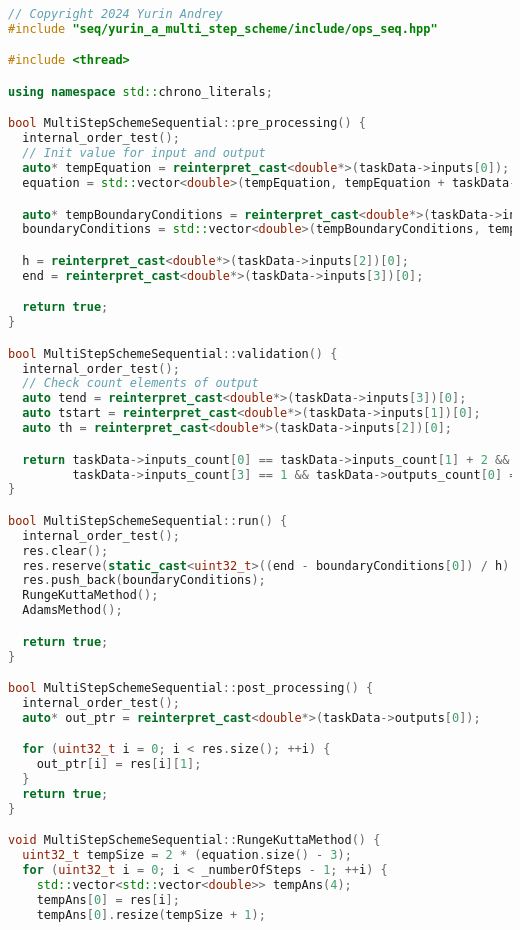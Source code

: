 \documentclass{report}
\begin{document}
\begin{lstlisting}[language=C++,caption=Последовательная версия]
// Copyright 2024 Yurin Andrey
#include "seq/yurin_a_multi_step_scheme/include/ops_seq.hpp"

#include <thread>

using namespace std::chrono_literals;

bool MultiStepSchemeSequential::pre_processing() {
  internal_order_test();
  // Init value for input and output
  auto* tempEquation = reinterpret_cast<double*>(taskData->inputs[0]);
  equation = std::vector<double>(tempEquation, tempEquation + taskData->inputs_count[0]);

  auto* tempBoundaryConditions = reinterpret_cast<double*>(taskData->inputs[1]);
  boundaryConditions = std::vector<double>(tempBoundaryConditions, tempBoundaryConditions + taskData->inputs_count[1]);

  h = reinterpret_cast<double*>(taskData->inputs[2])[0];
  end = reinterpret_cast<double*>(taskData->inputs[3])[0];

  return true;
}

bool MultiStepSchemeSequential::validation() {
  internal_order_test();
  // Check count elements of output
  auto tend = reinterpret_cast<double*>(taskData->inputs[3])[0];
  auto tstart = reinterpret_cast<double*>(taskData->inputs[1])[0];
  auto th = reinterpret_cast<double*>(taskData->inputs[2])[0];

  return taskData->inputs_count[0] == taskData->inputs_count[1] + 2 && taskData->inputs_count[2] == 1 &&
         taskData->inputs_count[3] == 1 && taskData->outputs_count[0] == (tend - tstart) / th + 1;
}

bool MultiStepSchemeSequential::run() {
  internal_order_test();
  res.clear();
  res.reserve(static_cast<uint32_t>((end - boundaryConditions[0]) / h) + 2);
  res.push_back(boundaryConditions);
  RungeKuttaMethod();
  AdamsMethod();

  return true;
}

bool MultiStepSchemeSequential::post_processing() {
  internal_order_test();
  auto* out_ptr = reinterpret_cast<double*>(taskData->outputs[0]);

  for (uint32_t i = 0; i < res.size(); ++i) {
    out_ptr[i] = res[i][1];
  }
  return true;
}

void MultiStepSchemeSequential::RungeKuttaMethod() {
  uint32_t tempSize = 2 * (equation.size() - 3);
  for (uint32_t i = 0; i < _numberOfSteps - 1; ++i) {
    std::vector<std::vector<double>> tempAns(4);
    tempAns[0] = res[i];
    tempAns[0].resize(tempSize + 1);


\end{lstlisting}
\end{document}
